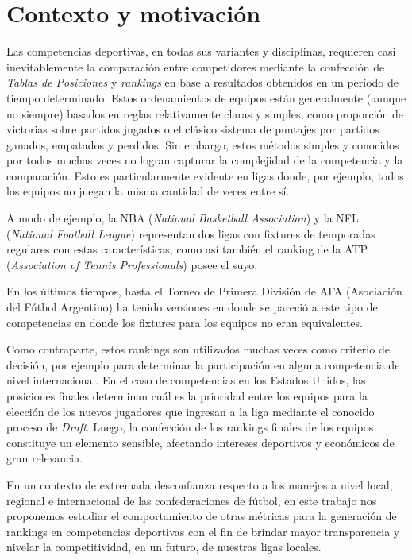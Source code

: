 \documentclass[11pt,a4paper]{article}
\begin{document}
	
	



\section*{Contexto y motivación}

Las competencias deportivas, en todas sus variantes y disciplinas, requieren casi inevitablemente la comparación entre competidores
mediante la confección de \emph{Tablas de Posiciones} y \emph{rankings} en base a resultados obtenidos en un período de tiempo determinado. 
Estos ordenamientos de equipos están generalmente (aunque no siempre) basados en reglas relativamente claras y simples, como proporción 
de victorias sobre partidos jugados o el clásico sistema de puntajes por partidos ganados, empatados y perdidos. Sin embargo, estos métodos
simples y conocidos por todos muchas veces no logran capturar la complejidad de la competencia y la comparación. Esto es particularmente
evidente en ligas donde, por ejemplo, todos los equipos no juegan la misma cantidad de veces entre sí.

A modo de ejemplo, la NBA (\textit{National Basketball Association}) y la NFL (\textit{National Football League}) representan dos ligas con fixtures de temporadas regulares con estas características, como así también el ranking de la ATP (\textit{Association of Tennis Professionals}) posee el suyo.

En los últimos tiempos, hasta el Torneo de 
Primera División de AFA (Asociación del Fútbol Argentino) ha tenido versiones en donde se pareció a este tipo de competencias en donde los fixtures para los equipos no eran equivalentes.

Como contraparte, estos rankings son utilizados muchas veces como criterio de decisión, por ejemplo para determinar la participación en alguna competencia de nivel internacional. En el caso de competencias en los Estados Unidos, las posiciones finales determinan cuál es la prioridad
entre los equipos para la elección de los nuevos jugadores que ingresan a la liga mediante el conocido proceso de \emph{Draft}. Luego, la confección 
de los rankings finales de los equipos constituye un elemento sensible, afectando intereses deportivos y económicos de gran relevancia. 

En un contexto de extremada desconfianza respecto a los manejos a nivel local, regional e internacional de las confederaciones de fútbol, en este
trabajo nos proponemos estudiar el comportamiento de otras métricas para la generación de rankings en competencias deportivas con el fin de brindar
mayor transparencia y nivelar la competitividad, en un futuro, de nuestras ligas locales.
\end{document}
